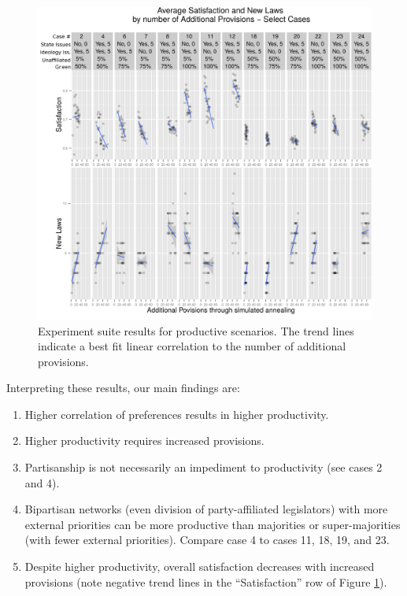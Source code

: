 \documentclass[pdftex,12pt,oribibl]{llncs}
\begin{document}
\begin{figure}[h!]
\centering
\includegraphics[width=4.75in]{combinedResults.png}
\caption[ ]{Experiment suite results for productive scenarios.  The trend lines indicate a best fit linear correlation to the number of additional provisions.} 
\label{combined}
\end{figure}

Interpreting these results, our main findings are:
\begin{enumerate}
\item Higher correlation of preferences results in higher productivity.
\item Higher productivity requires increased provisions.
\item Partisanship is not necessarily an impediment to productivity (see cases 2 and 4).
\item Bipartisan networks (even division of party-affiliated legislators) with more external priorities can be more productive than majorities or super-majorities (with fewer external priorities).  Compare case 4 to cases 11, 18, 19, and 23.
\item Despite higher productivity, overall satisfaction decreases with increased provisions (note negative trend lines in the ``Satisfaction'' row of Figure \ref{combined}).
\end{enumerate}
\end{document}
